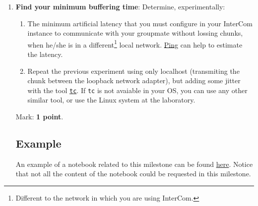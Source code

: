 \begin{enumerate}

\item \textbf{Find your minimum buffering time}:
Determine, experimentally:
\begin{enumerate}
\item The minimum artificial latency that you must configure in your
  InterCom instance to communicate with your groupmate without lossing
  chunks, when he/she is in a different\footnote{Different to the
    network in which you are using InterCom.} local
  network. \href{https://vicente-gonzalez-ruiz.github.io/about_ping/}{Ping}
  can help to estimate the latency.
\item Repeat the previous experiment using only localhost (transmiting
  the chunk between the loopback network adapter), but adding some
  jitter with the tool
  \href{https://vicente-gonzalez-ruiz.github.io/about_tc/}{\texttt{tc}}. If
  \texttt{tc} is not avaiable in your OS, you can use any other
  similar tool, or use the Linux system at the laboratory.
\end{enumerate}
Mark: \textbf{1 point}.

\subsection*{Example}
An example of a notebook related to this milestone can be found
\href{https://github.com/Tecnologias-multimedia/InterCom/blob/master/docs/Hidding_the_Network_Jitter__example.ipynb}{here}. Notice
that not all the content of the notebook could be requested in this
milestone.


\end{enumerate}
